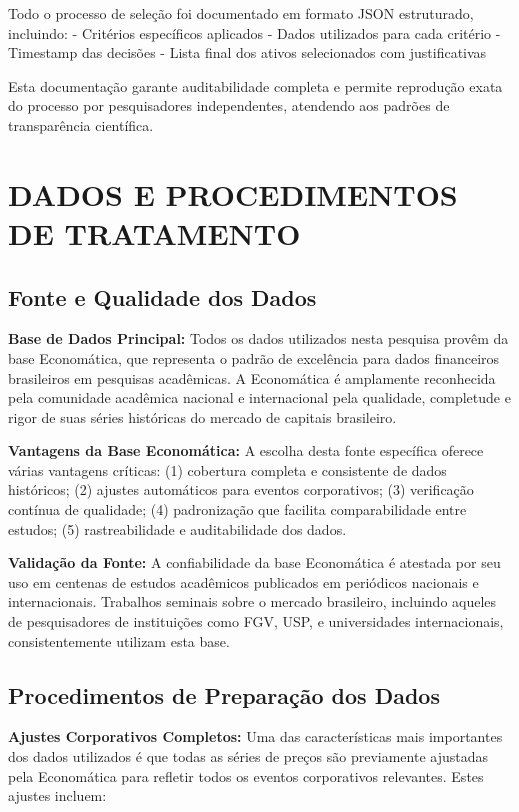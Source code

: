 Todo o processo de seleção foi documentado em formato JSON estruturado, incluindo:
- Critérios específicos aplicados
- Dados utilizados para cada critério
- Timestamp das decisões
- Lista final dos ativos selecionados com justificativas

Esta documentação garante auditabilidade completa e permite reprodução exata do processo por pesquisadores independentes, atendendo aos padrões de transparência científica.

\section{DADOS E PROCEDIMENTOS DE TRATAMENTO}

\subsection{Fonte e Qualidade dos Dados}

\textbf{Base de Dados Principal:} Todos os dados utilizados nesta pesquisa provêm da base Economática, que representa o padrão de excelência para dados financeiros brasileiros em pesquisas acadêmicas. A Economática é amplamente reconhecida pela comunidade acadêmica nacional e internacional pela qualidade, completude e rigor de suas séries históricas do mercado de capitais brasileiro.

\textbf{Vantagens da Base Economática:} A escolha desta fonte específica oferece várias vantagens críticas: (1) cobertura completa e consistente de dados históricos; (2) ajustes automáticos para eventos corporativos; (3) verificação contínua de qualidade; (4) padronização que facilita comparabilidade entre estudos; (5) rastreabilidade e auditabilidade dos dados.

\textbf{Validação da Fonte:} A confiabilidade da base Economática é atestada por seu uso em centenas de estudos acadêmicos publicados em periódicos nacionais e internacionais. Trabalhos seminais sobre o mercado brasileiro, incluindo aqueles de pesquisadores de instituições como FGV, USP, e universidades internacionais, consistentemente utilizam esta base.

\subsection{Procedimentos de Preparação dos Dados}

\textbf{Ajustes Corporativos Completos:} Uma das características mais importantes dos dados utilizados é que todas as séries de preços são previamente ajustadas pela Economática para refletir todos os eventos corporativos relevantes. Estes ajustes incluem:

